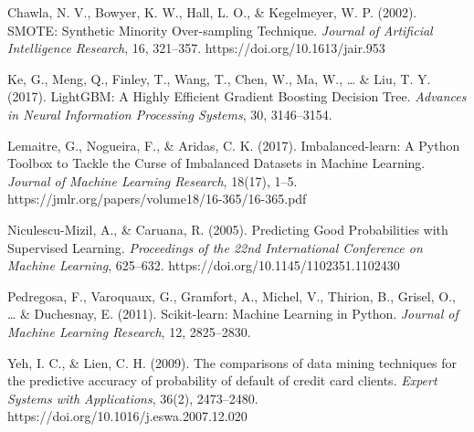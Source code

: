 \documentclass[journal]{apa7}
\begin{document}
\begin{thebibliography}{}

Chawla, N. V., Bowyer, K. W., Hall, L. O., \& Kegelmeyer, W. P. (2002). SMOTE: Synthetic Minority Over-sampling Technique. \emph{Journal of Artificial Intelligence Research}, 16, 321–357. https://doi.org/10.1613/jair.953

Ke, G., Meng, Q., Finley, T., Wang, T., Chen, W., Ma, W., \ldots{} \& Liu, T. Y. (2017). LightGBM: A Highly Efficient Gradient Boosting Decision Tree. \emph{Advances in Neural Information Processing Systems}, 30, 3146–3154.

Lemaitre, G., Nogueira, F., \& Aridas, C. K. (2017). Imbalanced-learn: A Python Toolbox to Tackle the Curse of Imbalanced Datasets in Machine Learning. \emph{Journal of Machine Learning Research}, 18(17), 1–5. https://jmlr.org/papers/volume18/16-365/16-365.pdf

Niculescu-Mizil, A., \& Caruana, R. (2005). Predicting Good Probabilities with Supervised Learning. \emph{Proceedings of the 22nd International Conference on Machine Learning}, 625–632. https://doi.org/10.1145/1102351.1102430

Pedregosa, F., Varoquaux, G., Gramfort, A., Michel, V., Thirion, B., Grisel, O., \ldots{} \& Duchesnay, E. (2011). Scikit-learn: Machine Learning in Python. \emph{Journal of Machine Learning Research}, 12, 2825–2830.

Yeh, I. C., \& Lien, C. H. (2009). The comparisons of data mining techniques for the predictive accuracy of probability of default of credit card clients. \emph{Expert Systems with Applications}, 36(2), 2473–2480. https://doi.org/10.1016/j.eswa.2007.12.020

\end{thebibliography}
\end{document}
